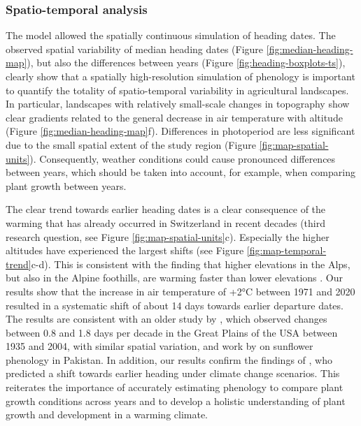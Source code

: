 \subsubsection{Spatio-temporal analysis}
The model allowed the spatially continuous simulation of heading dates. The observed spatial variability of median heading dates (Figure \ref{fig:median-heading-map}), but also the differences between years (Figure \ref{fig:heading-boxplots-ts}), clearly show that a spatially high-resolution simulation of phenology is important to quantify the totality of spatio-temporal variability in agricultural landscapes. In particular, landscapes with relatively small-scale changes in topography show clear gradients related to the general decrease in air temperature with altitude (Figure \ref{fig:median-heading-map}f). Differences in photoperiod are less significant due to the small spatial extent of the study region (Figure \ref{fig:map-spatial-units}). Consequently, weather conditions could cause pronounced differences between years, which should be taken into account, for example, when comparing plant growth between years.

The clear trend towards earlier heading dates is a clear consequence of the warming that has already occurred in Switzerland in recent decades (third research question, see Figure \ref{fig:map-spatial-units}c). Especially the higher altitudes have experienced the largest shifts (see Figure \ref{fig:map-temporal-trend}c-d). This is consistent with the finding that higher elevations in the Alps, but also in the Alpine foothills, are warming faster than lower elevations \citep{gusewell_changes_2017}. Our results show that the increase in air temperature of +2°C between 1971 and 2020 resulted in a systematic shift of about 14 days towards earlier departure dates. The results are consistent with an older study by \cite{hu_earlier_2005}, which observed changes between 0.8 and 1.8 days per decade in the Great Plains of the USA between 1935 and 2004, with similar spatial variation, and work by \cite{tariq_impact_2018} on sunflower phenology in Pakistan. In addition, our results confirm the findings of \cite{rogger_can_2021}, who predicted a shift towards earlier heading under climate change scenarios. This reiterates the importance of accurately estimating phenology to compare plant growth conditions across years and to develop a holistic understanding of plant growth and development in a warming climate.

